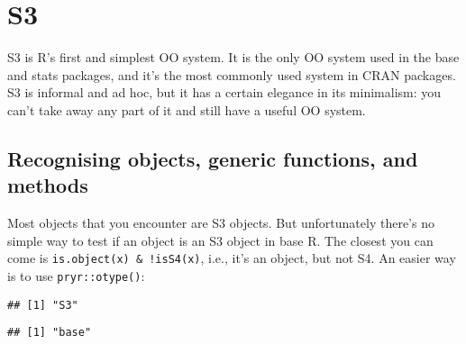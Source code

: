 \hypertarget{s3}{%
\section{S3}\label{s3}}

S3 is R's first and simplest OO system. It is the only OO system used in
the base and stats packages, and it's the most commonly used system in
CRAN packages. S3 is informal and ad hoc, but it has a certain elegance
in its minimalism: you can't take away any part of it and still have a
useful OO system.  

\hypertarget{recognising-objects-generic-functions-and-methods}{%
\subsection{Recognising objects, generic functions, and
methods}\label{recognising-objects-generic-functions-and-methods}}

Most objects that you encounter are S3 objects. But unfortunately
there's no simple way to test if an object is an S3 object in base R.
The closest you can come is \texttt{is.object(x)\ \&\ !isS4(x)}, i.e.,
it's an object, but not S4. An easier way is to use
\texttt{pryr::otype()}: 

\begin{Shaded}
\begin{Highlighting}[]

\StringTok{ }\NormalTok{(} \OperatorTok{:}\NormalTok{, }\NormalTok{ letters[}\OperatorTok{:}\NormalTok{])}
\end{Highlighting}
\end{Shaded}

\begin{verbatim}
## [1] "S3"
\end{verbatim}

\begin{Shaded}
\begin{Highlighting}[]
\OperatorTok{$}
\end{Highlighting}
\end{Shaded}

\begin{verbatim}
## [1] "base"
\end{verbatim}

